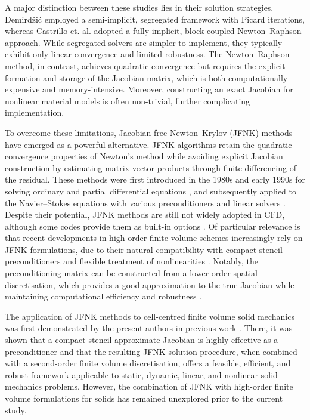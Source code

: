 \documentclass[review,3p]{elsarticle}
\begin{document}
A major distinction between these studies lies in their solution strategies. Demirdžić \cite{Demirdzic2016} employed a semi-implicit, segregated framework with Picard iterations, whereas Castrillo et. al. \cite{Castrillo2022,Castrillo2024} adopted a fully implicit, block-coupled Newton–Raphson approach. While segregated solvers are simpler to implement, they typically exhibit only linear convergence and limited robustness. The Newton–Raphson method, in contrast, achieves quadratic convergence but requires the explicit formation and storage of the Jacobian matrix, which is both computationally expensive and memory-intensive. Moreover, constructing an exact Jacobian for nonlinear material models is often non-trivial, further complicating implementation. 

To overcome these limitations, Jacobian-free Newton–Krylov (JFNK) methods have emerged as a powerful alternative. JFNK algorithms retain the quadratic convergence properties of Newton’s method while avoiding explicit Jacobian construction by estimating matrix-vector products through finite differencing of the residual. These methods were first introduced in the 1980s and early 1990s for solving ordinary and partial differential equations \cite{Gear1983, Chan1984, Brown1986, Brown1990}, and subsequently applied to the Navier–Stokes equations with various preconditioners and linear solvers  \cite{Qin2000, Geuzaine2001, Pernice2001, Nejat2008}. Despite their potential, JFNK methods are still not widely adopted in CFD, although some codes provide them as built-in options \cite{Nakashima2025}. Of particular relevance is that recent developments in high-order finite volume schemes increasingly rely on JFNK formulations, due to their natural compatibility with compact-stencil preconditioners and flexible treatment of nonlinearities \cite{Nishikawa2025}. Notably, the preconditioning matrix can be constructed from a lower-order spatial discretisation, which provides a good approximation to the true Jacobian while maintaining computational efficiency and robustness \cite{Qin2000, Geuzaine2001, Pernice2001, Nejat2008, Mchugh1994,  Knoll2004, Vaassen2008, Lucas2010,  Nishikawa2020}. 

The application of JFNK methods to cell-centred finite volume solid mechanics was first demonstrated by the present authors in previous work \cite{Cardiff2025}. There, it was shown that a compact-stencil approximate Jacobian is highly effective as a preconditioner and that the resulting JFNK solution procedure, when combined with a second-order finite volume discretisation, offers a feasible, efficient, and robust framework applicable to static, dynamic, linear, and nonlinear solid mechanics problems. However, the combination of JFNK with high-order finite volume formulations for solids has remained unexplored prior to the current study.
\end{document}
